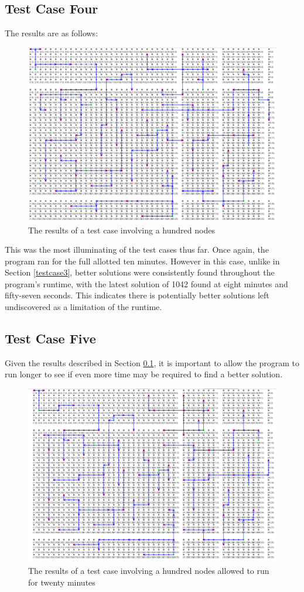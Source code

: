 \subsection{Test Case Four}\label{testcase4}
The results are as follows:
\begin{figure}[H]
    \centering
    \includegraphics[width=0.9\linewidth]{resultstest5.png}
    \caption{The results of a test case involving a hundred nodes}
    \label{fig:testcase4results}
\end{figure}

This was the most illuminating of the test cases thus far. Once again, the program ran for the full allotted ten minutes. However in this case, unlike in Section \ref{testcase3}, better solutions were consistently found throughout the program's runtime, with the latest solution of 1042 found at eight minutes and fifty-seven seconds. This indicates there is potentially better solutions left undiscovered as a limitation of the runtime.

\subsection{Test Case Five}
Given the results described in Section \ref{testcase4}, it is important to allow the program to run longer to see if even more time may be required to find a better solution.

\begin{figure}[H]
    \centering
    \includegraphics[width=0.9\linewidth]{resultstest6.png}
    \caption{The results of a test case involving a hundred nodes allowed to run for twenty minutes}
    \label{fig:testcase5results}
\end{figure}

